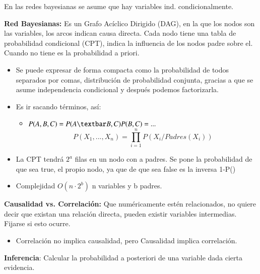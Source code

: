 \documentclass[12pt, twoside, openright]{report} %
\begin{document}
En las redes bayesianas se asume que hay variables ind.
condicionalmente.



  \textbf{Red Bayesianas:} Es un Grafo Acíclico Dirigido (DAG), en la
  que los nodos son las variables, los arcos indican causa directa. Cada
  nodo tiene una tabla de probabilidad condicional (CPT), indica la
  influencia de los nodos padre sobre el. Cuando no tiene es la
  probabilidad a priori.

  
  \begin{itemize}
  \item Se puede expresar de forma compacta como la probabilidad de todos
    separados por comas, distribución de probabilidad conjunta, gracias
    a que se asume independencia condicional y después podemos
    factorizarla.
    
  \item Es ir sacando términos, así:
    

    \begin{itemize}
    \item $P(A, B, C)= P(A\textbar B,C)P(B,C)=...$
     $$P(X_1, ..., X_n)=\prod^n_{i=1} P(X_i/Padres(X_i))$$
      
    \end{itemize}
  \item La CPT tendrá $2^a$ filas en un nodo con a padres. Se pone la
    probabilidad de que sea true, el propio nodo, ya que de que sea
    false es la inversa 1-P()
    
  \item Complejidad $O(n\cdot 2^b)$ n variables y b padres.
    
  \end{itemize}

 
  \textbf{Causalidad vs. Correlación:} Que numéricamente estén
  relacionados, no quiere decir que existan una relación directa, pueden
  existir variables intermedias. Fijarse si esto ocurre.
  

  \begin{itemize}
  \item Correlación no implica causalidad, pero Causalidad implica
    correlación.
    
  \end{itemize}

 
  \textbf{Inferencia}: Calcular la probabilidad a posteriori de una
  variable dada cierta evidencia.
  
\end{document}
